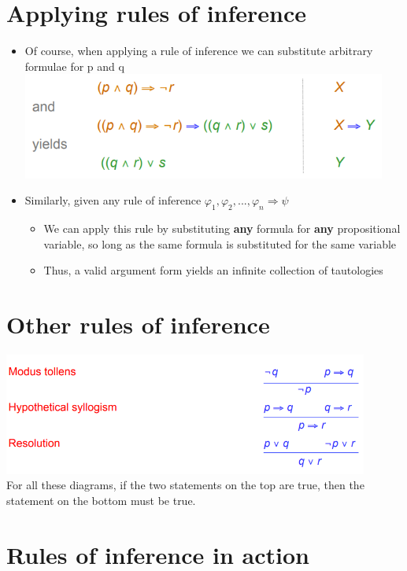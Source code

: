 \documentclass{article}[18pt]
\begin{document}
\section{Applying rules of inference}
\begin{itemize}
\item Of course, when applying a rule of inference we can substitute arbitrary formulae for p and q\\
\includegraphics[width=12cm]{Fig1.png}
\item Similarly, given any rule of inference $\varphi_1,\varphi_2,...,\varphi_n\Rightarrow\psi$
\begin{itemize}
\item We can apply this rule by substituting \textbf{any} formula for \textbf{any} propositional variable, so long as the same formula is substituted for the same variable
\item Thus, a valid argument form yields an infinite collection of tautologies
\end{itemize}
\end{itemize}
\section{Other rules of inference}
\includegraphics[width=12cm]{Fig2.png}\\
For all these diagrams, if the two statements on the top are true, then the statement on the bottom must be true.
\section{Rules of inference in action}
\end{document}
